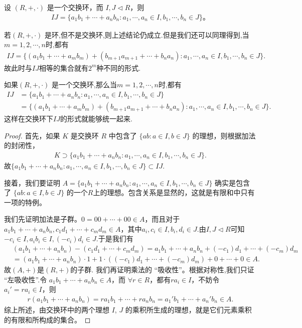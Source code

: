 \documentclass[../../main.tex]{subfiles}
\begin{document}
\begin{proposition}\label{proposition:理想的乘法表示形式}
设 $(R, +, \cdot)$ 是一个交换环，而 $I, J \lhd R$，则
\begin{align*}
IJ = \{a_1b_1 + \cdots + a_nb_n : a_1, \cdots, a_n \in I, b_1, \cdots, b_n \in J\} 。
\end{align*}
\end{proposition}
\begin{remark}
若$(R, +, \cdot)$ 是环,但不是交换环,则上述结论仍成立.但是我们还可以同理得到,当$m=1,2,\cdots,n$时,都有
\begin{align*}
IJ=\{\left( a_1b_1+\cdots +a_mb_m \right) +\left( b_{m+1}a_{m+1}+\cdots +b_na_n \right) :a_1,\cdots ,a_n\in I,b_1,\cdots ,b_n\in J\}.
\end{align*}
故此时与$IJ$相等的集合就有$2^m$种不同的形式.

如果$(R, +, \cdot)$ 是一个交换环,那么当$m=1,2,\cdots,n$时,都有
\begin{align*}
IJ&=\{a_1b_1+\cdots +a_nb_n:a_1,\cdots ,a_n\in I,b_1,\cdots ,b_n\in J\}
\\
&=\{\left( a_1b_1+\cdots +a_mb_m \right) +\left( b_{m+1}a_{m+1}+\cdots +b_na_n \right) :a_1,\cdots ,a_n\in I,b_1,\cdots ,b_n\in J\}.
\end{align*}
这样在交换环下$IJ$的形式就能够统一起来.
\end{remark}
\begin{proof}
首先，如果 $K$ 是交换环 $R$ 中包含了 $\{ab : a \in I, b \in J\}$ 的理想，则根据加法的封闭性，
\begin{align*}
K \supset \{a_1b_1 + \cdots + a_nb_n : a_1, \cdots, a_n \in I, b_1, \cdots, b_n \in J\} .
\end{align*}
故$\{a_1b_1 + \cdots + a_nb_n : a_1, \cdots, a_n \in I, b_1, \cdots, b_n \in J\} \subset IJ$.

接着，我们要证明 $A=\{a_1b_1 + \cdots + a_nb_n : a_1, \cdots, a_n \in I, b_1, \cdots, b_n \in J\}$ 确实是包含了 $\{ab : a \in I, b \in J\}$ 的一个$R$上的理想。包含关系是显然的，这就是有限和中只有一项的特例。

我们先证明加法是子群。$0 = 00 + \cdots + 00\in A$，而且对于 $a_1b_1 + \cdots + a_nb_n, c_1d_1 + \cdots + c_md_m \in A$，其中$a_i,c_i\in I,b_i,d_i\in J$.由$I,J\lhd R$可知$-c_i\in I,a_ib_i\in I,(-c_i)d_i\in J$.于是我们有
\begin{align*}
&(a_1b_1+\cdots +a_nb_n)-(c_1d_1+\cdots +c_md_m)=a_1b_1+\cdots +a_nb_n+(-c_1)d_1+\cdots +(-c_m)d_m
\\
&=\left( a_1b_1+\cdots +a_nb_n \right) \cdot 1+1\cdot \left( (-c_1)d_1+\cdots +(-c_m)d_m \right) +0+\cdots +0\in A.
\end{align*}
故$(A,+)$是$(R,+)$的子群.
我们再证明乘法的 “吸收性”。根据对称性,我们只证
“左吸收性”.令 $a_1b_1 + \cdots + a_nb_n \in A$，而 $\forall r \in R$，都有$ ra_i \in I$，不妨令 $a_i' = ra_i \in I$，则
\begin{align*}
r(a_1b_1 + \cdots + a_nb_n) = ra_1b_1 + \cdots + ra_nb_n = a_1'b_1 + \cdots + a_n'b_n \in A.
\end{align*}
综上所述，由交换环中的两个理想 $I$, $J$ 的乘积所生成的理想，就是它们元素乘积的有限和所构成的集合。

\end{proof}
\end{document}
